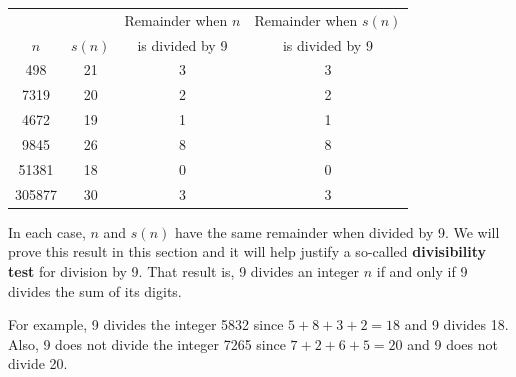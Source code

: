 \documentclass[11pt]{article}
\begin{document}
\begin{center}
\begin{tabular}[t]{| c | c | c | c |} \hline
     &                       &  Remainder when $n$  &  Remainder when $s \left( n \right)$ \\ 
$n$  &  $s \left( n \right)$  &  is divided by 9     &  is divided by 9  \\ \hline
498  &  21  &  3  &  3  \\ \hline
7319  &  20  &  2  &  2  \\ \hline
4672  &  19  &  1  &  1  \\ \hline
9845  &  26  &  8  &  8  \\ \hline
51381  &  18  &  0  &  0  \\ \hline
305877  &  30  &  3  &  3  \\ \hline
\end{tabular}
\end{center}
In each case, $n$ and $s(n)$ have the same remainder when divided by 9.  We will prove this result in this section and it will help justify a so-called \textbf{divisibility test} for division by 9.  That result is, 9 divides an integer $n$  if and only if 9 divides the sum of its digits.  

\eighth
\noindent
For example, 9 divides the integer 5832 since $5 + 8 + 3 + 2 = 18$ and 9 divides 18.  Also, 9 does not divide the integer 7265 since $7 + 2 + 6 + 5 = 20$ and 9 does not divide 20.
\hbreak
\end{document}
